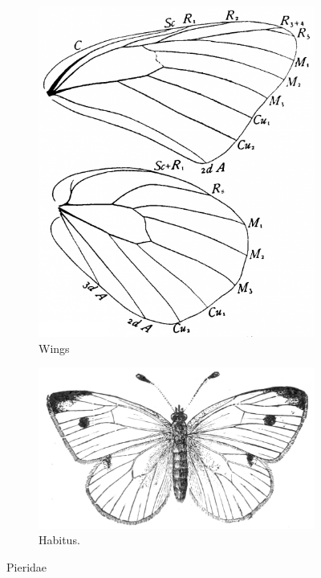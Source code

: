 \documentclass[letterpaper, 11pt]{article}
\begin{document}
\begin{figure}[ht!]
    \centering
    \begin{subfigure}[ht!]{0.25\textwidth}
        \includegraphics[width=\textwidth]{PieridWings}
        \caption{Wings \citep[Fig. 342]{comstock1918wings}}
        \label{fig:pierid1}
    \end{subfigure}
    \hfill %
    \begin{subfigure}[ht!]{0.5\textwidth}
        \includegraphics[width=\textwidth]{pieris.png}
        \caption{Habitus. \citep[Modified from Fig. 28 in][]{bhlitem37741}}
        \label{fig:pierid2}
    \end{subfigure}
    \caption{Pieridae}\label{fig:pierids}
\end{figure}
\end{document}
